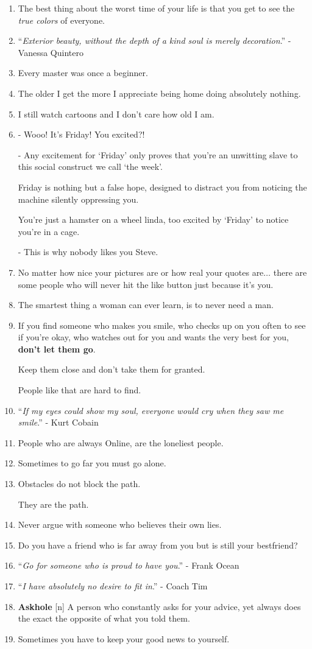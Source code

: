 \documentclass{article}
\numberwithin{equation}{section}
\begin{document}
\begin{enumerate}
    I just know what I want.
    \item The best thing about the worst time of your life is that you get to see the \textit{true colors} of everyone.
    \item ``\textit{Exterior beauty, without the depth of a kind soul is merely decoration}.'' - Vanessa Quintero
    \item Every master was once a beginner.
    \item The older I get the more I appreciate being home doing absolutely nothing.
    \item I still watch cartoons and I don't care how old I am.
    \item - Wooo! It's Friday! You excited?!
    
    - Any excitement for `Friday' only proves that you're an unwitting slave to this social construct we call `the week'.
    
    Friday is nothing but a false hope, designed to distract you from noticing the machine silently oppressing you.
    
    You're just a hamster on a wheel linda, too excited by `Friday' to notice you're in a cage.
    
    - This is why nobody likes you Steve.
    \item No matter how nice your pictures are or how real your quotes are$\ldots$ there are some people who will never hit the like button just because it's you.
    \item The smartest thing a woman can ever learn, is to never need a man.
    \item If you find someone who makes you smile, who checks up on you often to see if you're okay, who watches out for you and wants the very best for you, \textbf{don't let them go}.
    
    Keep them close and don't take them for granted.
    
    People like that are hard to find.
    \item ``\textit{If my eyes could show my soul, everyone would cry when they saw me smile}.'' - Kurt Cobain
    \item People who are always Online, are the loneliest people.
    \item Sometimes to go far you must go alone.
    \item Obstacles do not block the path.
    
    They are the path.
    \item Never argue with someone who believes their own lies.
    \item Do you have a friend who is far away from you but is still your bestfriend?
    \item ``\textit{Go for someone who is proud to have you}.'' - Frank Ocean
    \item ``\textit{I have absolutely no desire to fit in}.'' - Coach Tim
    \item \textbf{Askhole} [n] A person who constantly asks for your advice, yet always does the exact the opposite of what you told them.
    \item Sometimes you have to keep your good news to yourself.
    

\end{enumerate}
\end{document}

